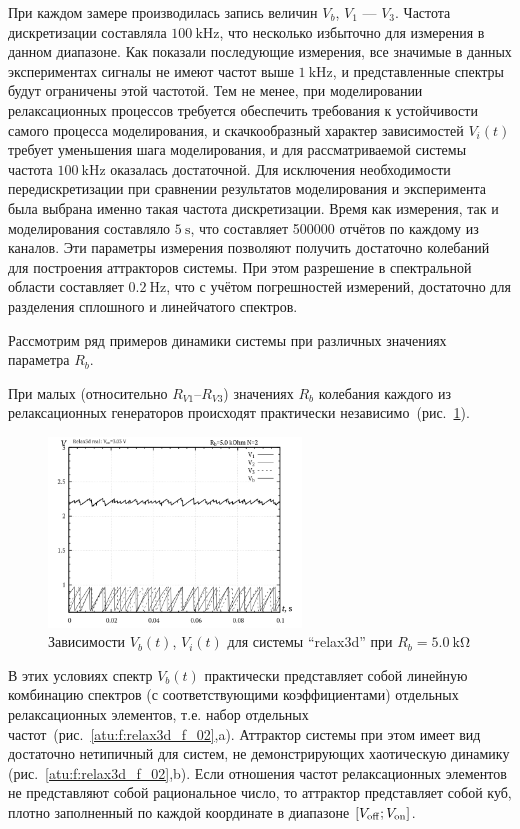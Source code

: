 При каждом замере
производилась запись величин
$V_b$, $V_1$ --- $V_3$.
Частота дискретизации составляла $\SI{100}{\kilo\hertz}$,
что несколько избыточно для измерения в данном диапазоне.
Как показали последующие измерения,
все значимые в данных экспериментах сигналы не имеют
частот выше $\SI{1}{\kilo\hertz}$,
и представленные спектры будут ограничены этой частотой.
Тем не менее, при моделировании релаксационных
процессов требуется обеспечить требования к устойчивости
самого процесса моделирования, и скачкообразный
характер зависимостей $V_i(t)$
требует уменьшения шага моделирования, и для
рассматриваемой системы частота
$\SI{100}{\kilo\hertz}$ оказалась достаточной.
Для исключения необходимости передискретизации
при сравнении результатов моделирования
и эксперимента была выбрана именно такая частота дискретизации.
Время как измерения, так и моделирования составляло
$\SI{5}{\s}$, что составляет 500000 отчётов
по каждому из каналов.
Эти параметры измерения позволяют получить достаточно
колебаний для построения аттракторов системы.
При этом разрешение в спектральной области
составляет
$\SI{0.2}{\hertz}$, что с учётом погрешностей измерений,
достаточно для разделения сплошного и линейчатого спектров.

Рассмотрим ряд примеров динамики системы
при различных значениях параметра $R_b$.

При малых (относительно $R_{V1}$--$R_{V3}$)
значениях $R_b$
колебания каждого из релаксационных генераторов
происходят практически независимо~(рис.~\ref{atu:f:relax3d_t_02}).

\begin{figure}[htb!]
  \centerline{\includegraphics[width=0.6\textwidth]{p/relax3d_t_02.png} }
  \caption{Зависимости $V_b(t)$, $V_i(t)$ для системы ``relax3d'' при $R_b=\SI{5.0}{\kilo\ohm}$ }
  \label{atu:f:relax3d_t_02}
\end{figure}

В этих условиях спектр $V_b(t)$ практически представляет собой линейную комбинацию спектров
(с соответствующими коэффициентами) отдельных релаксационных
элементов, т.е. набор отдельных частот~(рис.~\ref{atu:f:relax3d_f_02},a).
Аттрактор системы при этом имеет вид достаточно нетипичный для
систем, не демонстрирующих хаотическую динамику (рис.~\ref{atu:f:relax3d_f_02},b).
Если отношения частот релаксационных элементов
не представляют собой рациональное число, то аттрактор
представляет собой куб, плотно заполненный по каждой координате в
диапазоне $[ V_\mathrm{off} ; V_\mathrm{on} ] $.


